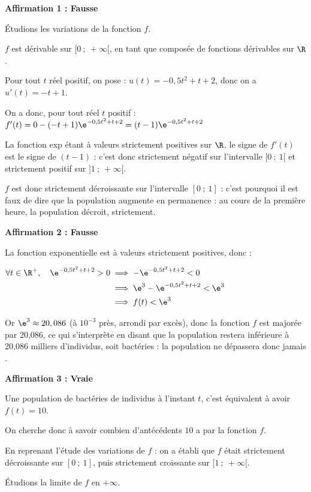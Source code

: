 
\bigskip

\textbf{Affirmation 1 : Fausse}

Étudions les variations de la fonction $f$.

$f$ est dérivable sur $ [0~;~+\infty[ $, en tant que composée de fonctions dérivables sur $\R$.

Pour tout $t$ réel positif, on pose : $u(t) = -0,5t^2 + t+2$, donc on a $u'(t) = -t + 1$.

On a donc, pour tout réel $t$ positif : $f'(t) = 0 - (-t + 1)\e^{-0,5t^2 + t + 2} = (t-1)\e^{-0,5t^2 + t + 2} $

La fonction exp étant à valeurs strictement positives sur $\R$, le signe de $f'(t)$ est le signe de $(t-1)$ : c'est donc strictement négatif sur l'intervalle $ [0~;~1[ $ et strictement positif sur $ ]1~;~+\infty[ $.

$f$ est donc strictement décroissante sur l'intervalle $[ 0~;~1]$ : c'est pourquoi il est faux de dire que la population augmente en permanence : au cours de la première heure, la population décroit, strictement.

\medskip
\textbf{Affirmation 2 : Fausse}

La fonction exponentielle est à valeurs strictement positives, donc :

$\aligned \forall t \in \R^+, \quad \e^{-0,5t^2 + t + 2} > 0 &\implies -\e^{-0,5t^2 + t + 2}<0\\
&\implies \e^3-\e^{-0,5t^2 + t + 2}<\e^3\\
&\implies f(t) < \e^3\\ \endaligned$

Or $\e^3 \approx 20,086$ (à $ 10^{-3} $ près, arrondi par excès), donc la fonction $f$ est majorée par 20,086, ce qui s'interprète en disant que la population restera inférieure à 20,086 milliers d'individus, soit  bactéries : la population ne dépassera donc jamais .

\medskip

\textbf{Affirmation 3 : Vraie}

Une population de bactéries de  individus à l'instant $t$, c'est équivalent à avoir $f(t) = 10$.

On cherche donc à savoir combien d'antécédents $10$ a par la fonction $f$.

En reprenant l'étude des variations de $f$ : on a établi que $f$ était strictement décroissante sur $[0~;~1]$, puis strictement croissante sur $ [1~;~+\infty[ $.

Étudions la limite de $f$ en $+\infty$.

